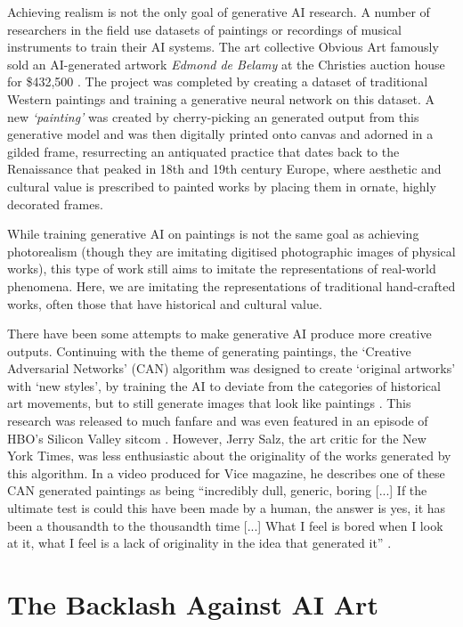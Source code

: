 Achieving realism is not the only goal of generative AI research. 
A number of researchers in the field use datasets of paintings or recordings of musical instruments to train their AI systems. 
The art collective Obvious Art famously sold an AI-generated artwork \textit{Edmond de Belamy} at the Christies auction house for \$432,500 \citep{christies2018edmond}.
The project was completed by creating a dataset of traditional Western paintings and training a generative neural network on this dataset. 
A new \textit{`painting’} was created by cherry-picking an generated output from this generative model and was then digitally printed onto canvas and adorned in a gilded frame, resurrecting an antiquated practice that dates back to the Renaissance that peaked in 18th and 19th century Europe, where aesthetic and cultural value is prescribed to painted works by placing them in ornate, highly decorated frames.

While training generative AI on paintings is not the same goal as achieving photorealism (though they are imitating digitised photographic images of physical works), this type of work still aims to imitate the representations of real-world phenomena. Here, we are imitating the representations of traditional hand-crafted works, often those that have historical and cultural value.

There have been some attempts to make generative AI produce more creative outputs. 
Continuing with the theme of generating paintings, the ‘Creative Adversarial Networks’ (CAN) algorithm was designed to create ‘original artworks’ with ‘new styles’, by training the AI to deviate from the categories of historical art movements, but to still generate images that look like paintings \cite{elgammal2017can}. 
This research was released to much fanfare and was even featured in an episode of HBO’s Silicon Valley sitcom \citep{elhoseiny2019hbo}. 
However, Jerry Salz, the art critic for the New York Times, was less enthusiastic about the originality of the works generated by this algorithm. 
In a video produced for Vice magazine, he describes one of these CAN generated paintings as being “incredibly dull, generic, boring [...] If the ultimate test is could this have been made by a human, the answer is yes, it has been a thousandth to the thousandth time [...] What I feel is bored when I look at it, what I feel is a lack of originality in the idea that generated it” \citep{saltz2018aiart}. 

\section{The Backlash Against AI Art}

